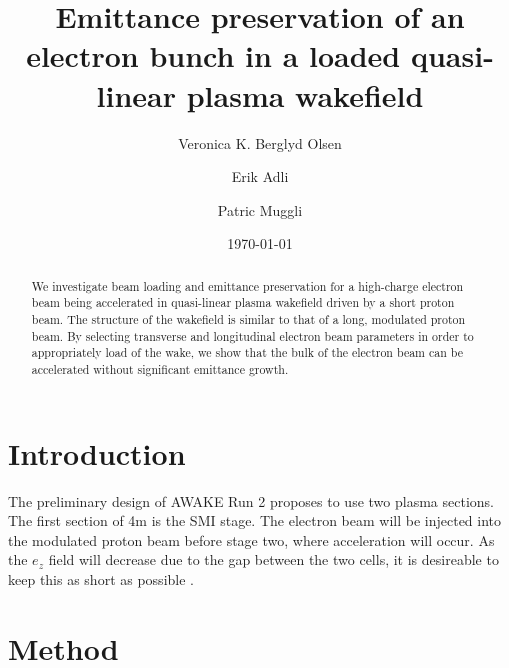 \documentclass[aps,prstab,reprint,amsmath,amssymb,groupedaddress]{revtex4-1}
\begin{document}

\title{Emittance preservation of an electron bunch in a loaded quasi-linear plasma wakefield}

\author{Veronica K. Berglyd Olsen}

\author{Erik Adli}

\author{Patric Muggli}

\date{\today}

\begin{abstract}
We investigate beam loading and emittance preservation for a high-charge electron beam being accelerated in quasi-linear
plasma wakefield driven by a short proton beam. The structure of the wakefield is similar to that of a long, modulated
proton beam. By selecting transverse and longitudinal electron beam parameters in order to  appropriately load of the
wake, we show that the bulk of the electron beam can be accelerated without significant emittance growth.
\end{abstract}

\maketitle

\section[\label{S:I}]{Introduction}


The preliminary design of AWAKE Run 2 proposes to use two plasma sections. The first section of 4m is the SMI stage. The
electron beam will be injected into the modulated proton beam before stage two, where acceleration will occur. As the
$e_z$ field will decrease due to the gap between the two cells, it is desireable to keep this as short as possible
\cite{adli:2016}.

\section[\label{S:M}]{Method}
\end{document}
